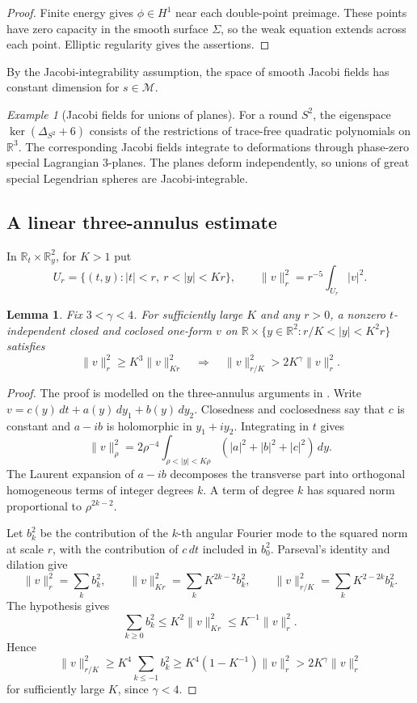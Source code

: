 \documentclass[11pt,a4paper]{article}
\numberwithin{equation}{section}
\newtheorem{lemma}[theorem]{Lemma}
\theoremstyle{definition}
\theoremstyle{remark}
\newtheorem*{example*}{Example}
\newcommand{\R}{\mathbb R}
\begin{document}
	\begin{proof}
		Finite energy gives $\phi\in H^1$ near each double-point preimage.
		These points have zero capacity in the smooth surface $\Sigma$, so
		the weak equation extends across each point. Elliptic regularity gives the
		assertions.
	\end{proof}
	
	By the Jacobi-integrability assumption, the space of smooth Jacobi fields
	has constant dimension for $s\in\mathcal M$.
	
	\begin{example*}[Jacobi fields for unions of planes]
		For a round $S^2$, the eigenspace $\ker(\Delta_{S^2}+6)$ consists
		of the restrictions of trace-free quadratic polynomials on $\R^3$.
		The corresponding Jacobi fields integrate to deformations through
		phase-zero special Lagrangian 3-planes. The planes deform independently,
		so unions of great special Legendrian spheres are Jacobi-integrable.
	\end{example*}
	
	\subsection{A linear three-annulus estimate}
	
	In $\R_t\times\R_y^2$, for $K>1$ put
	\[
	U_r=\{(t,y):|t|<r,\ r<|y|<Kr\},\qquad
	\|v\|_r^2=r^{-5}\int_{U_r}|v|^2.
	\]
	
	\begin{lemma}\label{lem:linear-three-annulus}
		Fix $3<\gamma<4$. For sufficiently large $K$ and any $r>0$,
		a nonzero $t$-independent closed and coclosed one-form $v$ on
		$\R\times\{y\in\R^2:r/K<|y|<K^2r\}$
		satisfies
		\[
		\|v\|_r^2\ge K^3\|v\|_{K r}^2
		\quad\Longrightarrow\quad
		\|v\|_{r/K}^2>2K^{\gamma}\|v\|_r^2.
		\]
	\end{lemma}
	
	\begin{proof}
		The proof is modelled on the three-annulus arguments in \cite{ES,Sze21}.
		Write $v=c(y)\,dt+a(y)\,dy_1+b(y)\,dy_2$.
		Closedness and coclosedness say that $c$ is constant and $a-ib$ is
		holomorphic in $y_1+iy_2$. Integrating in $t$ gives
		\[
		\|v\|_\rho^2
		=2\rho^{-4}\int_{\rho<|y|<K\rho}(|a|^2+|b|^2+|c|^2)\,dy.
		\]
		The Laurent expansion of $a-ib$ decomposes the transverse part into
		orthogonal homogeneous terms of integer degrees $k$. A term of degree
		$k$ has squared norm proportional to $\rho^{2k-2}$.
		
		Let $b_k^2$ be the contribution of the $k$-th angular Fourier mode to
		the squared norm at scale $r$, with
		the contribution of $c\,dt$ included in $b_0^2$.
		Parseval's identity and dilation give
		\[
		\|v\|_r^2=\sum_k b_k^2,\qquad
		\|v\|_{K r}^2=\sum_k K^{2k-2}b_k^2,\qquad
		\|v\|_{r/K}^2=\sum_k K^{2-2k}b_k^2.
		\]
		The hypothesis gives
		\[
		\sum_{k\ge0}b_k^2\le K^2\|v\|_{K r}^2
		\le K^{-1}\|v\|_r^2.
		\]
		Hence
		\[
		\|v\|_{r/K}^2\ge K^4\sum_{k\le-1}b_k^2
		\ge K^4(1-K^{-1})\|v\|_r^2
		>2K^{\gamma}\|v\|_r^2
		\]
		for sufficiently large $K$, since $\gamma<4$.
	\end{proof}
	
\end{document}
